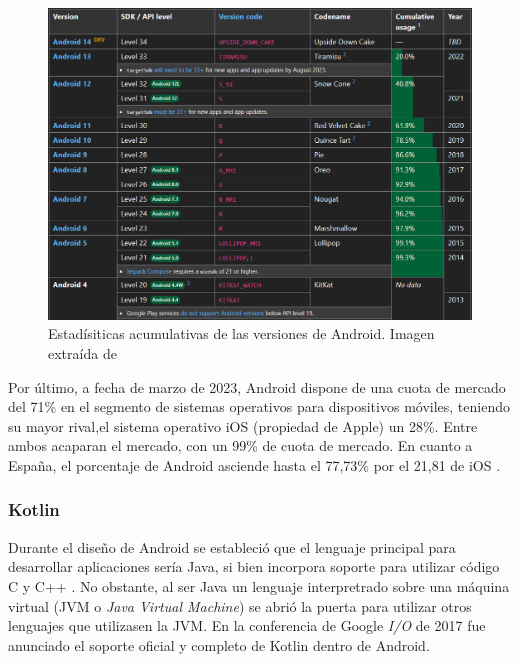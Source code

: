             \begin{figure}[H]
                \centering
                \includegraphics[width=1\textwidth]{figures/Android usage.PNG}
                \caption[Estadísiticas acumulativas de las versiones de Android]
                {Estadísiticas acumulativas de las versiones de Android. Imagen extraída de \cite{belinski_android_nodate}}
                \label{figure:android:usage}
            \end{figure}

            Por último, a fecha de marzo de 2023, Android dispone de una cuota de mercado del 71\% en el segmento de sistemas 
            operativos para dispositivos móviles, teniendo su mayor rival,el sistema operativo iOS (propiedad de Apple) 
            un 28\%. Entre ambos acaparan el mercado, con un 99\% de cuota de mercado. En cuanto a España, el 
            porcentaje de Android asciende hasta el 77,73\% por el 21,81 de iOS \cite{press_asi_2023}.

        \subsubsection{Kotlin}

            Durante el diseño de Android se estableció que el lenguaje principal para desarrollar aplicaciones sería 
            Java, si bien incorpora soporte para utilizar código C y C++ \cite{android_developers_como_nodate}. No
            obstante, al ser Java un lenguaje interpretrado sobre una máquina virtual (JVM o \textit{Java Virtual
            Machine}) se abrió la puerta para  utilizar otros lenguajes que utilizasen la JVM. En la conferencia de 
            Google \textit{I/O} de 2017 fue anunciado el soporte oficial y completo 
            de Kotlin dentro de Android. \newline

